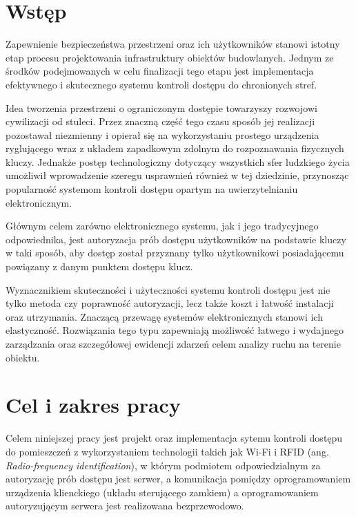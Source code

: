 \label{chap:intro}

	\section{Wstęp}
		Zapewnienie bezpieczeństwa przestrzeni oraz ich użytkowników stanowi istotny etap procesu projektowania infrastruktury obiektów budowlanych. Jednym ze środków podejmowanych w celu finalizacji tego etapu jest implementacja efektywnego i skutecznego systemu kontroli dostępu do chronionych stref.

		Idea tworzenia przestrzeni o ograniczonym dostępie towarzyszy rozwojowi cywilizacji od stuleci. Przez znaczną część tego czasu sposób jej realizacji pozostawał niezmienny i opierał się na wykorzystaniu prostego urządzenia ryglującego wraz z układem zapadkowym zdolnym do rozpoznawania fizycznych kluczy. Jednakże postęp technologiczny dotyczący wszystkich sfer ludzkiego życia umożliwił wprowadzenie szeregu usprawnień również w tej dziedzinie, przynosząc popularność systemom kontroli dostępu opartym na uwierzytelnianiu elektronicznym.

		Głównym celem zarówno elektronicznego systemu, jak i jego tradycyjnego odpowiednika, jest autoryzacja prób dostępu użytkowników na podstawie kluczy w taki sposób, aby dostęp został przyznany tylko użytkownikowi posiadającemu powiązany z danym punktem dostępu klucz.

		Wyznacznikiem skuteczności i użyteczności systemu kontroli dostępu jest nie tylko metoda czy poprawność autoryzacji, lecz także koszt i łatwość instalacji oraz utrzymania. Znaczącą przewagę systemów elektronicznych stanowi ich elastyczność. Rozwiązania tego typu zapewniają możliwość łatwego i wydajnego zarządzania oraz szczegółowej ewidencji zdarzeń celem analizy ruchu na terenie obiektu.

	\section{Cel i zakres pracy}

		Celem niniejszej pracy jest projekt oraz implementacja sytemu kontroli dostępu do pomieszczeń z wykorzystaniem technologii takich jak Wi-Fi i RFID (ang. \textit{Radio-frequency identification}), w którym podmiotem odpowiedzialnym za autoryzację prób dostępu jest serwer, a komunikacja pomiędzy oprogramowaniem urządzenia klienckiego (układu sterującego zamkiem) a oprogramowaniem autoryzującym serwera jest realizowana bezprzewodowo.

